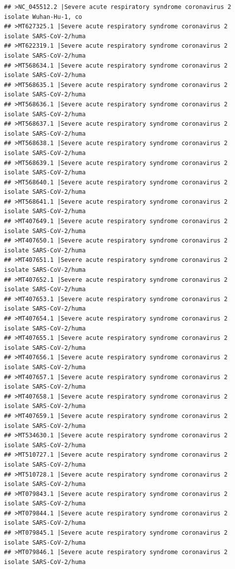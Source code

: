 \documentclass[
]{book}
\begin{document}
\begin{verbatim}
## >NC_045512.2 |Severe acute respiratory syndrome coronavirus 2 isolate Wuhan-Hu-1, co
## >MT627325.1 |Severe acute respiratory syndrome coronavirus 2 isolate SARS-CoV-2/huma
## >MT622319.1 |Severe acute respiratory syndrome coronavirus 2 isolate SARS-CoV-2/huma
## >MT568634.1 |Severe acute respiratory syndrome coronavirus 2 isolate SARS-CoV-2/huma
## >MT568635.1 |Severe acute respiratory syndrome coronavirus 2 isolate SARS-CoV-2/huma
## >MT568636.1 |Severe acute respiratory syndrome coronavirus 2 isolate SARS-CoV-2/huma
## >MT568637.1 |Severe acute respiratory syndrome coronavirus 2 isolate SARS-CoV-2/huma
## >MT568638.1 |Severe acute respiratory syndrome coronavirus 2 isolate SARS-CoV-2/huma
## >MT568639.1 |Severe acute respiratory syndrome coronavirus 2 isolate SARS-CoV-2/huma
## >MT568640.1 |Severe acute respiratory syndrome coronavirus 2 isolate SARS-CoV-2/huma
## >MT568641.1 |Severe acute respiratory syndrome coronavirus 2 isolate SARS-CoV-2/huma
## >MT407649.1 |Severe acute respiratory syndrome coronavirus 2 isolate SARS-CoV-2/huma
## >MT407650.1 |Severe acute respiratory syndrome coronavirus 2 isolate SARS-CoV-2/huma
## >MT407651.1 |Severe acute respiratory syndrome coronavirus 2 isolate SARS-CoV-2/huma
## >MT407652.1 |Severe acute respiratory syndrome coronavirus 2 isolate SARS-CoV-2/huma
## >MT407653.1 |Severe acute respiratory syndrome coronavirus 2 isolate SARS-CoV-2/huma
## >MT407654.1 |Severe acute respiratory syndrome coronavirus 2 isolate SARS-CoV-2/huma
## >MT407655.1 |Severe acute respiratory syndrome coronavirus 2 isolate SARS-CoV-2/huma
## >MT407656.1 |Severe acute respiratory syndrome coronavirus 2 isolate SARS-CoV-2/huma
## >MT407657.1 |Severe acute respiratory syndrome coronavirus 2 isolate SARS-CoV-2/huma
## >MT407658.1 |Severe acute respiratory syndrome coronavirus 2 isolate SARS-CoV-2/huma
## >MT407659.1 |Severe acute respiratory syndrome coronavirus 2 isolate SARS-CoV-2/huma
## >MT534630.1 |Severe acute respiratory syndrome coronavirus 2 isolate SARS-CoV-2/huma
## >MT510727.1 |Severe acute respiratory syndrome coronavirus 2 isolate SARS-CoV-2/huma
## >MT510728.1 |Severe acute respiratory syndrome coronavirus 2 isolate SARS-CoV-2/huma
## >MT079843.1 |Severe acute respiratory syndrome coronavirus 2 isolate SARS-CoV-2/huma
## >MT079844.1 |Severe acute respiratory syndrome coronavirus 2 isolate SARS-CoV-2/huma
## >MT079845.1 |Severe acute respiratory syndrome coronavirus 2 isolate SARS-CoV-2/huma
## >MT079846.1 |Severe acute respiratory syndrome coronavirus 2 isolate SARS-CoV-2/huma

\end{verbatim}
\end{document}
